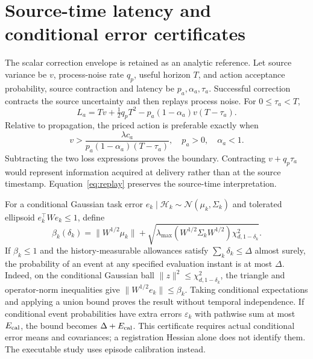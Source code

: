 \section{Source-time latency and conditional error certificates}\label{app:certificate}
The scalar correction envelope is retained as an analytic reference. Let source variance be $v$, process-noise rate $q_p$, useful horizon $T$, and action acceptance probability, source contraction and latency be $p_a,\alpha_a,\tau_a$. Successful correction contracts the source uncertainty and then replays process noise. For $0\le\tau_a<T$,
\begin{equation}
L_a=Tv+\tfrac12q_pT^2-p_a(1-\alpha_a)v(T-\tau_a).\label{eq:scalar-loss}
\end{equation}
Relative to propagation, the priced action is preferable exactly when
\begin{equation}
v>\frac{\lambda c_a}{p_a(1-\alpha_a)(T-\tau_a)},\quad p_a>0,\quad\alpha_a<1.\label{eq:scalar-boundary}
\end{equation}
Subtracting the two loss expressions proves the boundary. Contracting $v+q_p\tau_a$ would represent information acquired at delivery rather than at the source timestamp. Equation~\eqref{eq:replay} preserves the source-time interpretation.

For a conditional Gaussian task error $e_k\mid\mathcal H_k\sim\mathcal N(\mu_k,\Sigma_k)$ and tolerated ellipsoid $e_k^\top We_k\le1$, define
\begin{equation}
\beta_k(\delta_k)=\|W^{1/2}\mu_k\|+
\sqrt{\lambda_{\max}(W^{1/2}\Sigma_kW^{1/2})\chi^2_{d,1-\delta_k}}.\label{eq:gaussian-envelope}
\end{equation}
If $\beta_k\le1$ and the history-measurable allowances satisfy $\sum_k\delta_k\le\Delta$ almost surely, the probability of an event at any specified evaluation instant is at most $\Delta$. Indeed, on the conditional Gaussian ball $\|z\|^2\le\chi^2_{d,1-\delta_k}$, the triangle and operator-norm inequalities give $\|W^{1/2}e_k\|\le\beta_k$. Taking conditional expectations and applying a union bound proves the result without temporal independence. If conditional event probabilities have extra errors $\varepsilon_k$ with pathwise sum at most $E_{\rm cal}$, the bound becomes $\Delta+E_{\rm cal}$. This certificate requires actual conditional error means and covariances; a registration Hessian alone does not identify them. The executable study uses episode calibration instead.

